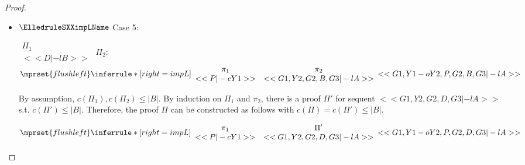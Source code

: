 \begin{proof}
\begin{enumerate}
\begin{itemize}
  \item $\ElledruleSXXimpLName$ Case 5:
      \begin{center}
        \scriptsize
        \begin{math}
          \begin{array}{c}
            \Pi_1 \\
            {<<D |-l B>>}
          \end{array}
        \end{math}
        \qquad\qquad
        $\Pi_2$:
        \begin{math}
          $$\mprset{flushleft}
          \inferrule* [right={\tiny impL}] {
            {
              \begin{array}{cc}
                \pi_1 & \pi_2 \\
                {<<P |-c Y1>>} & {<<G1, Y2, G2, B, G3 |-l A>>}
              \end{array}
            }
          }{<<G1, Y1 -o Y2, P, G2, B, G3 |-l A>>}
        \end{math}
      \end{center}
      By assumption, $c(\Pi_1),c(\Pi_2)\leq |B|$. By induction on $\Pi_1$ and $\pi_2$, there is
      a proof $\Pi'$ for sequent $<<G1, Y2, G2, D, G3 |-l A>>$ s.t. $c(\Pi') \leq |B|$.
      Therefore, the proof $\Pi$ can be constructed as follows with
      $c(\Pi) = c(\Pi') \leq |B|$.
      \begin{center}
        \scriptsize
        \begin{math}
          $$\mprset{flushleft}
          \inferrule* [right={\tiny impL}] {
            {
              \begin{array}{cc}
                \pi_1 & \Pi' \\
                {<<P |-c Y1>>} & {<<G1, Y2, G2, D, G3 |-l A>>}
              \end{array}
            }
          }{<<G1, Y1 -o Y2, P, G2, D, G3 |-l A>>}
        \end{math}
      \end{center}


\end{itemize}
\end{enumerate}
\end{proof}
